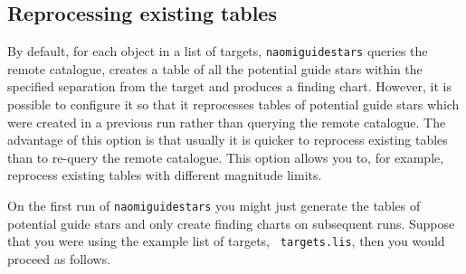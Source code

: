 \documentclass[twoside,11pt]{article}
\renewcommand{\_}{\texttt{\symbol{95}}}
\begin{document}
\subsection{\label{REPROC_T}Reprocessing existing tables}

By default, for each object in a list of targets, {\tt naomiguidestars}
queries the remote catalogue, creates a table of all the potential guide
stars within the specified separation from the target and produces a
finding chart.  However, it is possible to configure it so that it
reprocesses tables of potential guide stars which were created in a
previous run rather than querying the remote catalogue.  The advantage
of this option is that usually it is quicker to reprocess existing
tables than to re-query the remote catalogue.  This option allows you
to, for example, reprocess existing tables with different magnitude limits.

On the first run of {\tt naomiguidestars} you might just generate the
tables of potential guide stars and only create finding charts on subsequent
runs.  Suppose that you were using the example list of targets, {\tt
targets.lis}, then you would proceed as follows.
\end{document}
